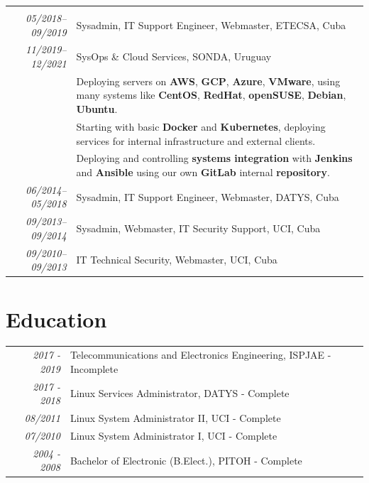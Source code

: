 \documentclass[a4paper,14pt]{article}
\begin{document}
\begin{tabular}{r|p{12cm}}
 \multicolumn{2}{c}{} \\  
 \emph{05/2018–09/2019} & Sysadmin, IT Support Engineer, Webmaster, ETECSA, Cuba \\
 \emph{11/2019–12/2021} & SysOps \& Cloud Services, 
SONDA, Uruguay \\
\textsc{}&\footnotesize{Deploying servers on \textbf{AWS}, \textbf{GCP}, \textbf{Azure}, \textbf{VMware}, using many systems like \textbf{CentOS}, \textbf{RedHat}, \textbf{openSUSE}, \textbf{Debian}, \textbf{Ubuntu}.}\\&
\footnotesize{Starting with basic \textbf{Docker} and \textbf{Kubernetes}, deploying services for internal infrastructure and external clients.}\\&
\footnotesize{Deploying and controlling \textbf{systems integration} with \textbf{Jenkins} and \textbf{Ansible} using our own \textbf{GitLab} internal \textbf{repository}.}\\
 \emph{06/2014–05/2018} & Sysadmin, IT Support Engineer, Webmaster, DATYS, Cuba \\
 \emph{09/2013–09/2014} & Sysadmin, Webmaster, IT Security Support, UCI, Cuba \\
\emph{09/2010–09/2013} & IT Technical Security, Webmaster,  UCI, Cuba \\
\end{tabular}

\section{Education}
\begin{tabular}{r|p{11cm}}
	\emph{2017 - 2019}  &Telecommunications and Electronics Engineering, ISPJAE - Incomplete \\
	\emph{2017 - 2018}  & Linux Services Administrator, DATYS - Complete \\
	\emph{08/2011}  & Linux System Administrator II, UCI - Complete \\
	\emph{07/2010}  & Linux System Administrator I, UCI - Complete \\
	\emph{2004 - 2008}  & Bachelor of Electronic (B.Elect.), PITOH - Complete \\
\end{tabular}
\end{document}
